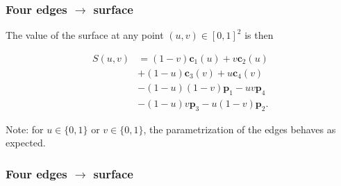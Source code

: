 \documentclass{beamer}
\begin{document}
\begin{frame}
  \frametitle{Four edges $\rightarrow$ surface}

  The value of the surface at any point $(u,v) \in [0,1]^2$ is then

  \begin{align*}
    S(u,v) &= (1-v)\mathbf{c}_1(u) + v\mathbf{c}_2(u) \\
    &+ (1-u)\mathbf{c}_3(v) + u\mathbf{c}_4(v) \\
    &- (1-u)(1-v)\mathbf{p}_1 - uv\mathbf{p}_4 \\
    &- (1-u)v\mathbf{p}_3 - u(1-v)\mathbf{p}_2.
  \end{align*}

  Note: for $u\in\{0,1\}$ or $v\in\{0,1\}$, the parametrization of the edges behaves as expected.
\end{frame}

\begin{frame}
  \frametitle{Four edges $\rightarrow$ surface}

  \begin{figure}
    \centering
  \end{figure}
\end{frame}
\end{document}
